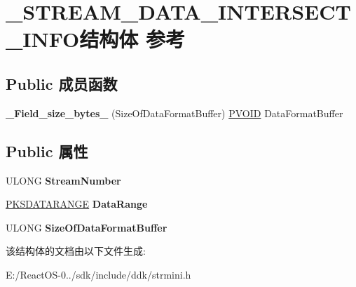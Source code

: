 \hypertarget{struct___s_t_r_e_a_m___d_a_t_a___i_n_t_e_r_s_e_c_t___i_n_f_o}{}\section{\+\_\+\+S\+T\+R\+E\+A\+M\+\_\+\+D\+A\+T\+A\+\_\+\+I\+N\+T\+E\+R\+S\+E\+C\+T\+\_\+\+I\+N\+F\+O结构体 参考}
\label{struct___s_t_r_e_a_m___d_a_t_a___i_n_t_e_r_s_e_c_t___i_n_f_o}
\subsection*{Public 成员函数}
\begin{DoxyCompactItemize}
\item 
\mbox{\label{struct___s_t_r_e_a_m___d_a_t_a___i_n_t_e_r_s_e_c_t___i_n_f_o_a024b74e91748b6e1dcba44e8072798f8}} 
{\bfseries \+\_\+\+Field\+\_\+size\+\_\+bytes\+\_\+} (Size\+Of\+Data\+Format\+Buffer) \hyperlink{interfacevoid}{P\+V\+O\+ID} Data\+Format\+Buffer
\end{DoxyCompactItemize}
\subsection*{Public 属性}
\begin{DoxyCompactItemize}
\item 
\mbox{\label{struct___s_t_r_e_a_m___d_a_t_a___i_n_t_e_r_s_e_c_t___i_n_f_o_ab982ba1995e6a0fccd5a1338afed750e}} 
U\+L\+O\+NG {\bfseries Stream\+Number}
\item 
\mbox{\label{struct___s_t_r_e_a_m___d_a_t_a___i_n_t_e_r_s_e_c_t___i_n_f_o_ad86ebe18c2110867ca8498638dbce7b0}} 
\hyperlink{struct_k_s_d_a_t_a_f_o_r_m_a_t}{P\+K\+S\+D\+A\+T\+A\+R\+A\+N\+GE} {\bfseries Data\+Range}
\item 
\mbox{\label{struct___s_t_r_e_a_m___d_a_t_a___i_n_t_e_r_s_e_c_t___i_n_f_o_ad2230e31d8a5c46ed3426e61998a7fab}} 
U\+L\+O\+NG {\bfseries Size\+Of\+Data\+Format\+Buffer}
\end{DoxyCompactItemize}


该结构体的文档由以下文件生成\+:\begin{DoxyCompactItemize}
\item 
E\+:/\+React\+O\+S-\/0../sdk/include/ddk/strmini.\+h\end{DoxyCompactItemize}
